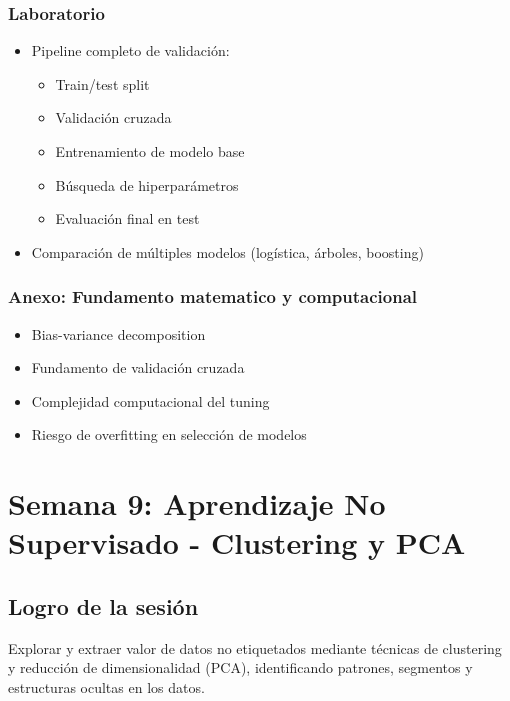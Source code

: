 \documentclass[12pt,a4paper,openany,oneside]{book}
\begin{document}
\begin{itemize}
\subsection{Laboratorio}
\begin{itemize}
    \item Pipeline completo de validación:
    \begin{itemize}
        \item Train/test split
        \item Validación cruzada
        \item Entrenamiento de modelo base
        \item Búsqueda de hiperparámetros
        \item Evaluación final en test
    \end{itemize}
    \item Comparación de múltiples modelos (logística, árboles, boosting)
\end{itemize}

\subsection{Anexo: Fundamento matematico y computacional}
\begin{itemize}
    \item Bias-variance decomposition
    \item Fundamento de validación cruzada
    \item Complejidad computacional del tuning
    \item Riesgo de overfitting en selección de modelos
\end{itemize}

\chapter{Semana 9: Aprendizaje No Supervisado - Clustering y PCA}

\section{Logro de la sesión}
Explorar y extraer valor de datos no etiquetados mediante técnicas de clustering y reducción de dimensionalidad (PCA), identificando patrones, segmentos y estructuras ocultas en los datos.


\end{itemize}
\end{document}
